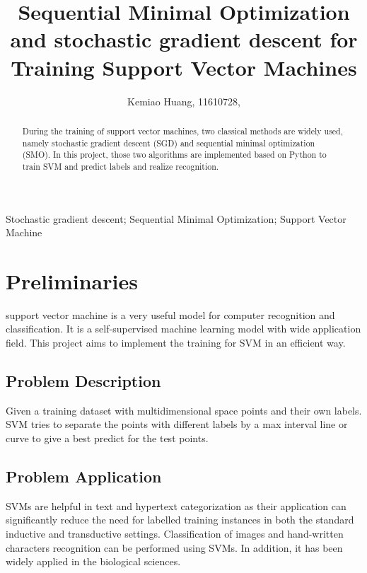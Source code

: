 \documentclass[journal,twoside,web]{ieeecolor}
\begin{document}
\title{
\bigskip Sequential Minimal Optimization and stochastic gradient descent for Training Support Vector Machines}
\author{Kemiao Huang, 11610728, 
\vspace{-4ex}}
\maketitle

\begin{abstract}
During the training of support vector machines, two classical methods are widely used, namely stochastic gradient descent (SGD) and sequential minimal optimization (SMO). In this project, those two algorithms are implemented based on Python to train SVM and predict labels and realize recognition. 
\end{abstract}

\begin{IEEEkeywords}
Stochastic gradient descent; Sequential Minimal Optimization; Support Vector Machine
\end{IEEEkeywords}

\section{Preliminaries}
\label{sec:preliminaries}
 support vector machine is a very useful model for computer recognition and classification. It is a self-supervised machine learning model with wide application field. This project aims to implement the training for SVM in an efficient way.
\subsection{Problem Description}
Given a training dataset with multidimensional space points and their own labels. SVM tries to separate the points with different labels by a max interval line or curve to give a best predict for the test points.

\subsection{Problem Application}
SVMs are helpful in text and hypertext categorization as their application can significantly reduce the need for labelled training instances in both the standard inductive and transductive settings. Classification of images and hand-written characters recognition can be performed using SVMs. In addition, it has been widely applied in the biological sciences.
\end{document}

